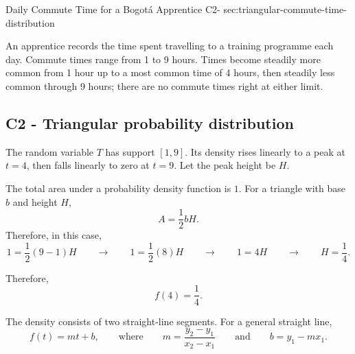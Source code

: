 	\sectionScored
	{Daily Commute Time for a Bogotá Apprentice}
	{C2-}
	{sec:triangular-commute-time-distribution}
	{
		An apprentice records the time spent travelling to a training programme each day. Commute times range from 1 to 9 hours. Times become steadily more common from 1 hour up to a most common time of 4 hours, then
		steadily less common through 9 hours; there are no commute times right at either limit.
		
		
		\label{subsec:triangular-commute-time-probabilities}
		\subsection*{C2 - Triangular probability distribution }
		
		The random variable \(T\) has support \([1,9]\). Its density rises
		linearly to a peak at \(t=4\), then falls linearly to zero at \(t=9\).
		Let the peak height be \(H\).
		
		

		The total area under a probability density function is \(1\).
		For a triangle with base \(b\) and height \(H\),
		\[
		A=\frac12 bH.
		\]
		Therefore, in this case,
		\[
		1
		=
		\frac12(9-1)H
		\qquad \rightarrow \qquad
		1
		=
		\frac12(8)H
		\qquad \rightarrow \qquad
		1=4H
		\qquad \rightarrow \qquad
		H=\frac14.
		\]
		
		Therefore,
		\[
		f(4)=\frac14.
		\]
		
		

		The density consists of two straight-line segments. For a general straight line,
		\[
		f(t)=mt+b,
		\qquad
		\text{where}
		\qquad
		m=\frac{y_2-y_1}{x_2-x_1}
		\qquad\text{and}\qquad
		b=y_1-mx_1.
		\]
		
}
